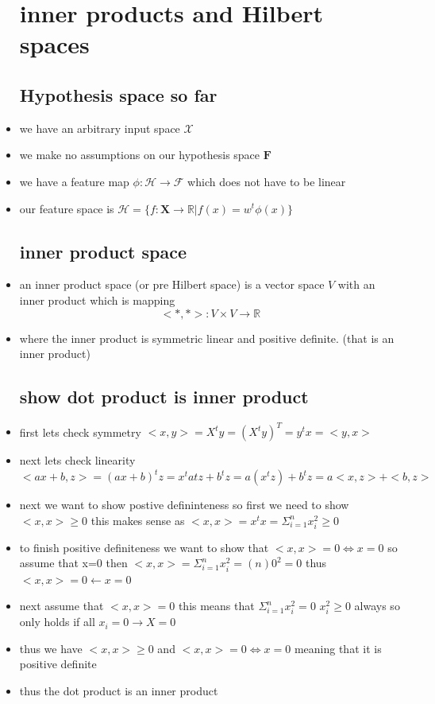 \documentclass{article}
\begin{document}
\begin{itemize}
\section{inner products and Hilbert spaces}
\subsection{Hypothesis  space so far }
\item we have an arbitrary input space $\mathcal{X}$
\item we make no assumptions on our hypothesis space $\mathbf{F}$
\item we have a feature map $\phi:\mathcal{H}\rightarrow \mathcal{F}$ which does not have to be linear 
\item our feature space is $\mathcal{H}=\{f:\mathbf{X}\rightarrow \mathbb{R}|f(x)=w^{t}\phi(x)\} $
\subsection{inner product space}
\item an inner product space (or pre Hilbert space) is a vector space $V$ with an inner product which is mapping $$<*,*>:V\times V\rightarrow \mathbb{R}$$
\item where the inner product is symmetric linear and positive definite. (that is an inner product)
\subsection{show dot product is inner product}
\item first lets check symmetry $<x,y>=X^{t}y=(X^{t}y)^{T}=y^{t}x=<y,x>$
\item next lets check linearity $<ax+b,z>=(ax+b)^{t}z=x^{t}a{t}z+b^{t}z=a(x^{t}z)+b^{t}z=a<x,z>+<b,z>$
\item next we want to show postive defininteness so first we need to show $<x,x>\geq 0$ this makes sense as $<x,x>=x^{t}x=\Sigma_{i=1}^{n}x_{i}^2\geq 0$
\item to finish positive definiteness we want to show that $<x,x>=0\iff x=0$ so assume that x=0 then $<x,x>=\Sigma_{i=1}^{n}x_i^2=(n)0^{2}=0$ thus $<x,x>=0\leftarrow x=0$ 
\item next assume that $<x,x>=0$ this means that $\Sigma_{i=1}^{n}x_i^{2}=0$ $x_i^2\geq 0$ always so only holds if all $x_i=0\rightarrow X=0$
\item thus we have $<x,x>\geq 0$ and $<x,x>=0\iff x=0$ meaning that it is positive definite 
\item thus the dot product is an inner product 

\end{itemize}
\end{document}
